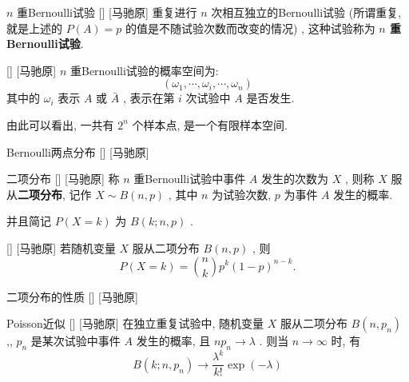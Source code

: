 \documentclass[UTF8]{ctexart}
\begin{document}
        \begin{dfn}
            []
            { \(n\) 重Bernoulli试验}
            []
            [马驰原]
            重复进行 \(n\) 次相互独立的Bernoulli试验 (所谓重复, 就是上述的 \(P(A)=p\) 的值是不随试验次数而改变的情况) , 这种试验称为\textbf{ \(n\) 重Bernoulli试验}. 
        \end{dfn}

        \begin{ppt}
            []
            {}
            []
            [马驰原]
             \(n\) 重Bernoulli试验的概率空间为: \[(\omega_1,\cdots,\omega_i,\cdots,\omega_n)\]其中的 \(\omega_i\) 表示 \(A\) 或 \(\bar{A}\) , 表示在第 \(i\) 次试验中 \(A\) 是否发生. 

            由此可以看出, 一共有 \(2^n\) 个样本点, 是一个有限样本空间. 
        \end{ppt}

        \begin{dfn}
            []
            {Bernoulli两点分布}
            []
            [马驰原]
        \end{dfn}

        \begin{dfn}
            []
            {二项分布}
            []
            [马驰原]
            称 \(n\) 重Bernoulli试验中事件 \(A\) 发生的次数为 \(X\) , 则称 \(X\) 服从\textbf{二项分布}, 记作 \(X\sim B(n,p)\) , 其中 \(n\) 为试验次数,  \(p\) 为事件 \(A\) 发生的概率. 

            并且简记 \(P(X=k)\) 为 \(B(k;n,p)\) .
        \end{dfn}

        \begin{thm}
            []
            {}
            []
            [马驰原]
            若随机变量 \(X\) 服从二项分布 \(B(n,p)\) , 则\[P(X=k)=\binom{n}{k}p^k(1-p)^{n-k}.\]
        \end{thm}

        \begin{ppt}
            []
            {二项分布的性质}
            []
            [马驰原]
        \end{ppt}

        \begin{thm}
            []
            {Poisson近似}
            []
            [马驰原]
            在独立重复试验中, 随机变量 \(X\) 服从二项分布 \(B(n,p_n)\) ,,  \(p_n\) 是某次试验中事件 \(A\) 发生的概率, 且 \(np_n\to\lambda \) . 则当 \(n\to\infty\) 时, 有\[B(k;n,p_n)\to\frac{\lambda^k}{k!}\exp (-\lambda) \]
        \end{thm}
\end{document}
